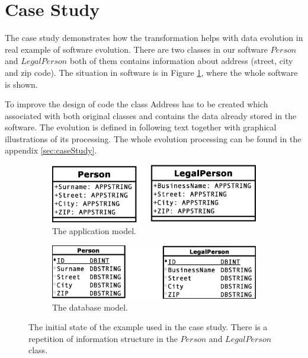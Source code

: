 \documentclass[11pt]{article}
\begin{document}
 
\section{Case Study}
The case study demonstrates how the transformation helps with data evolution in real example of software evolution. There are two classes in our software $Person$ and $LegalPerson$ both of them contains information about address (street, city and zip code). The situation in software is in Figure \ref{fig:case1}, where the whole software is shown. 

To improve the design of code the class Address has to be created which associated with both original classes and contains the data already stored in the software. The evolution is defined in following text together with graphical illustrations of its processing. The whole evolution processing can be found in the appendix \ref{sec:caseStudy}.

\begin{figure}
\begin{subfigure}[b]{0.5\textwidth}
	\includegraphics[width=\textwidth]{./images/case_app_1}
	\caption{The application model.}
\end{subfigure}
\begin{subfigure}[b]{0.5\textwidth}
	\includegraphics[width=\textwidth]{./images/case_db_1}
	\caption{The database model.}
\end{subfigure}
	\caption{The initial state of the example used in the case study. There is a repetition of information structure in the $Person$ and $LegalPerson$ class.}
	\label{fig:case1}
\end{figure}
\end{document}
